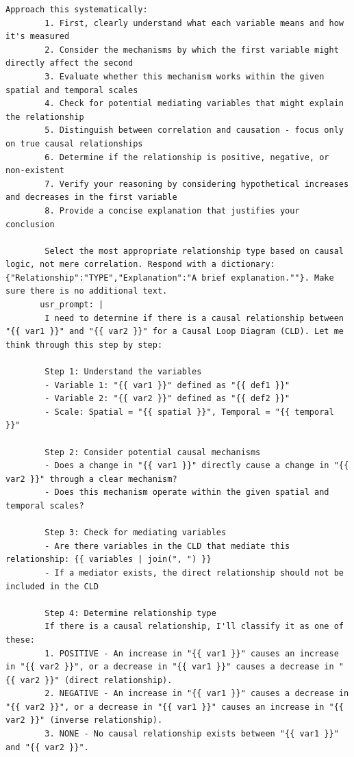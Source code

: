 \begin{lstlisting}[caption={Generator Prompt Configuration: Nitai\_C (\texttt{generateNodes} + \texttt{generateEdges})},label={lst:generator_nitai_c_yaml}]
        Approach this systematically:
        1. First, clearly understand what each variable means and how it's measured
        2. Consider the mechanisms by which the first variable might directly affect the second
        3. Evaluate whether this mechanism works within the given spatial and temporal scales
        4. Check for potential mediating variables that might explain the relationship
        5. Distinguish between correlation and causation - focus only on true causal relationships
        6. Determine if the relationship is positive, negative, or non-existent
        7. Verify your reasoning by considering hypothetical increases and decreases in the first variable
        8. Provide a concise explanation that justifies your conclusion
        
        Select the most appropriate relationship type based on causal logic, not mere correlation. Respond with a dictionary: {"Relationship":"TYPE","Explanation":"A brief explanation.""}. Make sure there is no additional text.
       usr_prompt: | 
        I need to determine if there is a causal relationship between "{{ var1 }}" and "{{ var2 }}" for a Causal Loop Diagram (CLD). Let me think through this step by step:
        
        Step 1: Understand the variables
        - Variable 1: "{{ var1 }}" defined as "{{ def1 }}"
        - Variable 2: "{{ var2 }}" defined as "{{ def2 }}"
        - Scale: Spatial = "{{ spatial }}", Temporal = "{{ temporal }}"
        
        Step 2: Consider potential causal mechanisms
        - Does a change in "{{ var1 }}" directly cause a change in "{{ var2 }}" through a clear mechanism?
        - Does this mechanism operate within the given spatial and temporal scales?
        
        Step 3: Check for mediating variables
        - Are there variables in the CLD that mediate this relationship: {{ variables | join(", ") }}
        - If a mediator exists, the direct relationship should not be included in the CLD
        
        Step 4: Determine relationship type
        If there is a causal relationship, I'll classify it as one of these:
        1. POSITIVE - An increase in "{{ var1 }}" causes an increase in "{{ var2 }}", or a decrease in "{{ var1 }}" causes a decrease in "{{ var2 }}" (direct relationship).
        2. NEGATIVE - An increase in "{{ var1 }}" causes a decrease in "{{ var2 }}", or a decrease in "{{ var1 }}" causes an increase in "{{ var2 }}" (inverse relationship).
        3. NONE - No causal relationship exists between "{{ var1 }}" and "{{ var2 }}".


\end{lstlisting}
